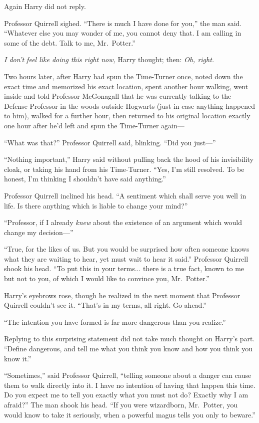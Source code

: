 Again Harry did not reply.

Professor Quirrell sighed. “There is much I have done for you,” the man said. “Whatever else you may wonder of me, you cannot deny that. I am calling in some of the debt. Talk to me, Mr.~Potter.”

\emph{I don’t feel like doing this right now,} Harry thought; then: \emph{Oh, right.}
\sbreak

Two hours later, after Harry had spun the Time-Turner once, noted down the exact time and memorized his exact location, spent another hour walking, went inside and told Professor McGonagall that he was currently talking to the Defense Professor in the woods outside Hogwarts (just in case anything happened to him), walked for a further hour, then returned to his original location exactly one hour after he’d left and spun the Time-Turner again—
\sbreak

“What was that?” Professor Quirrell said, blinking. “Did you just—”

“Nothing important,” Harry said without pulling back the hood of his invisibility cloak, or taking his hand from his Time-Turner. “Yes, I’m still resolved. To be honest, I’m thinking I shouldn’t have said anything.”

Professor Quirrell inclined his head. “A sentiment which shall serve you well in life. Is there anything which is liable to change your mind?”

“Professor, if I already \emph{knew} about the existence of an argument which would change my decision—”

“True, for the likes of us. But you would be surprised how often someone knows what they are waiting to hear, yet must wait to hear it said.” Professor Quirrell shook his head. “To put this in your terms... there is a true fact, known to me but not to you, of which I would like to convince you, Mr.~Potter.”

Harry’s eyebrows rose, though he realized in the next moment that Professor Quirrell couldn’t see it. “That’s in my terms, all right. Go ahead.”

“The intention you have formed is far more dangerous than you realize.”

Replying to this surprising statement did not take much thought on Harry’s part. “Define dangerous, and tell me what you think you know and how you think you know it.”

“Sometimes,” said Professor Quirrell, “telling someone about a danger can cause them to walk directly into it. I have no intention of having that happen this time. Do you expect me to tell you exactly what you must not do? Exactly why I am afraid?” The man shook his head. “If you were wizardborn, Mr.~Potter, you would know to take it seriously, when a powerful magus tells you only to beware.”

